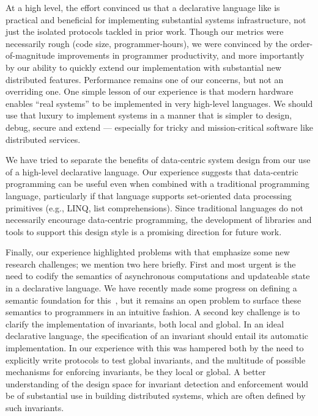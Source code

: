 At a high level, the effort convinced us that a declarative language like
\OVERLOG is practical and beneficial for implementing substantial systems
infrastructure, not just the isolated protocols tackled in prior work.  Though
our metrics were necessarily rough (code size, programmer-hours), we were
convinced by the order-of-magnitude improvements in programmer productivity, and 
more importantly by our ability to quickly extend our implementation with
substantial new distributed features.  Performance remains one of our concerns,
but not an overriding one.  One simple lesson of our experience is that modern
hardware enables ``real systems'' to be implemented in very high-level
languages.  We should use that luxury to implement systems in a manner that is
simpler to design, debug, secure and extend --- especially for tricky and 
mission-critical software like distributed services.

We have tried to separate the benefits of data-centric system design from our 
use of a high-level declarative language. Our experience suggests that
data-centric programming can be useful even when combined with a traditional
programming language, particularly if that language supports set-oriented data
processing primitives (e.g., LINQ, list comprehensions). Since traditional
languages do not necessarily encourage data-centric programming, the development
of libraries and tools to support this design style is a promising direction for 
future work.

Finally, our experience highlighted problems with \OVERLOG that emphasize some
new research challenges; we mention two here briefly.  First and most urgent is
the need to codify the semantics of asynchronous computations and updateable
state in a declarative language.  We have recently made some progress on
defining a semantic foundation for this~\cite{dedalus-tr}, but it remains an
open problem to surface these semantics to programmers in an intuitive fashion.
A second key challenge is to clarify the implementation of invariants, both
local and global.  In an ideal declarative language, the specification of an
invariant should entail its automatic implementation.  In our experience with
\OVERLOG this was hampered both by the need to explicitly write protocols to test
global invariants, and the multitude of possible mechanisms for enforcing
invariants, be they local or global.  A better understanding of the design space
for invariant detection and enforcement would be of substantial use in building
distributed systems, which are often defined by such invariants.

